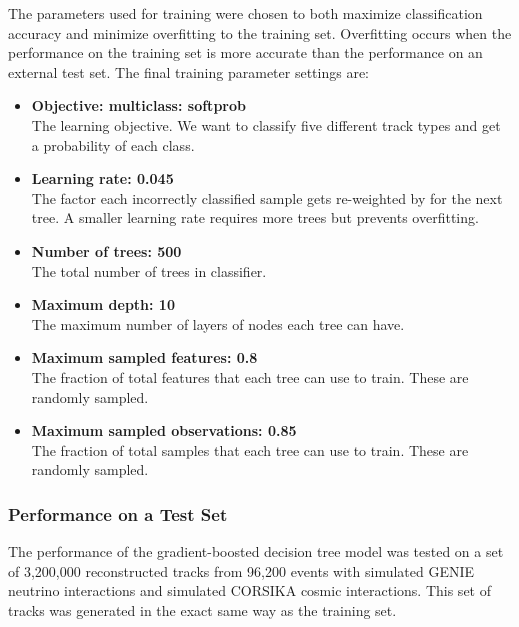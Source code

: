    The parameters used for training were chosen to both maximize
    classification accuracy and minimize overfitting to the training set.
    Overfitting occurs when the performance on the training set is more
    accurate than the performance on an external test set. The final training
    parameter settings are:
    \begin{itemize}
      \item \textbf{Objective: multiclass: softprob} \\
      The learning objective. We want to classify five different track types
      and get a probability of each class.  
      \item \textbf{Learning rate: 0.045}  \\
      The factor each incorrectly classified sample gets re-weighted by for the
      next tree.  A smaller learning rate requires more trees but prevents
      overfitting.
      \item \textbf{Number of trees: 500} \\
      The total number of trees in classifier.
      \item \textbf{Maximum depth: 10} \\ 
      The maximum number of layers of nodes each tree can have.
      \item \textbf{Maximum sampled features: 0.8} \\
      The fraction of total features that each tree can use to train. These are
      randomly sampled.
      \item \textbf{Maximum sampled observations: 0.85} \\
      The fraction of total samples that each tree can use to train. These are
      randomly sampled.
    \end{itemize}

  \subsubsection{Performance on a Test Set}
    The performance of the gradient-boosted decision tree model was tested on a
    set of 3,200,000 reconstructed tracks from 96,200 events with simulated
    GENIE neutrino interactions and simulated CORSIKA cosmic interactions. This
    set of tracks was generated in the exact same way as the training set.

